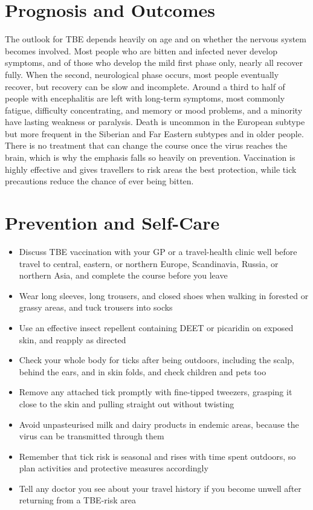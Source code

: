 \section*{Prognosis and Outcomes}
The outlook for TBE depends heavily on age and on whether the nervous system becomes involved. Most people who are bitten and infected never develop symptoms, and of those who develop the mild first phase only, nearly all recover fully. When the second, neurological phase occurs, most people eventually recover, but recovery can be slow and incomplete. Around a third to half of people with encephalitis are left with long-term symptoms, most commonly fatigue, difficulty concentrating, and memory or mood problems, and a minority have lasting weakness or paralysis. Death is uncommon in the European subtype but more frequent in the Siberian and Far Eastern subtypes and in older people. There is no treatment that can change the course once the virus reaches the brain, which is why the emphasis falls so heavily on prevention. Vaccination is highly effective and gives travellers to risk areas the best protection, while tick precautions reduce the chance of ever being bitten.

\section*{Prevention and Self-Care}
\begin{itemize}
    \item Discuss TBE vaccination with your GP or a travel-health clinic well before travel to central, eastern, or northern Europe, Scandinavia, Russia, or northern Asia, and complete the course before you leave
    \item Wear long sleeves, long trousers, and closed shoes when walking in forested or grassy areas, and tuck trousers into socks
    \item Use an effective insect repellent containing DEET or picaridin on exposed skin, and reapply as directed
    \item Check your whole body for ticks after being outdoors, including the scalp, behind the ears, and in skin folds, and check children and pets too
    \item Remove any attached tick promptly with fine-tipped tweezers, grasping it close to the skin and pulling straight out without twisting
    \item Avoid unpasteurised milk and dairy products in endemic areas, because the virus can be transmitted through them
    \item Remember that tick risk is seasonal and rises with time spent outdoors, so plan activities and protective measures accordingly
    \item Tell any doctor you see about your travel history if you become unwell after returning from a TBE-risk area
\end{itemize}

